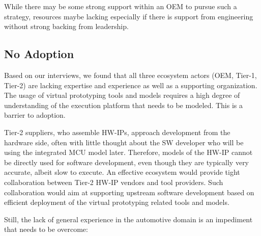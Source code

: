 While there may be some strong support within an OEM to pursue such a strategy, resources maybe lacking especially if there is support from engineering without strong backing from leadership.


\subsection{No Adoption}
Based on our interviews, we found that all three ecosystem actors (OEM, Tier-1, Tier-2) are lacking expertise and experience as well as a supporting organization.
The usage of virtual prototyping tools and models requires a high degree of understanding of the execution platform that needs to be modeled. This is a barrier to adoption.

Tier-2 suppliers, who assemble HW-IPs, approach development from the hardware side, often with little thought about the SW developer who will be using the integrated MCU model later.
Therefore, models of the HW-IP cannot be directly used for software development, even though they are typically very accurate, albeit slow to execute.
An effective ecosystem would provide tight collaboration between Tier-2 HW-IP vendors and tool providers. Such collaboration would aim at supporting upstream software development based on efficient deployment of the virtual prototyping related tools and models.

Still, the lack of general experience in the automotive domain is an impediment that needs to be overcome:

